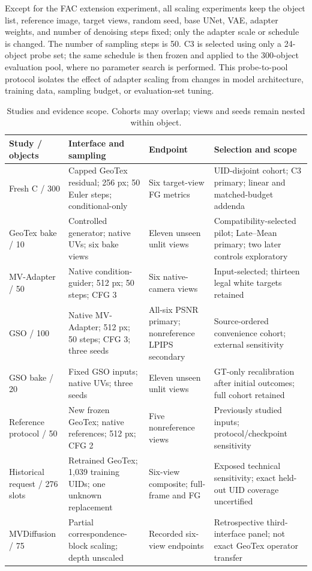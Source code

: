\documentclass[times,twocolumn,final]{elsarticle}
\providecommand{\DIFdel}[1]{{\protect\color{red} \scriptsize #1}} %
\providecommand{\DIFaddbegin}{} %
\providecommand{\DIFaddend}{} %
\providecommand{\DIFdelbegin}{} %
\providecommand{\DIFdelend}{} %
\begin{document}
\DIFdelbegin \DIFdel{Except for the FAC extension experiment, all scaling experiments keep the object list, reference image, target views, random seed, base UNet, VAE, adapter weights, and number of denoising steps fixed; only the adapter scale or schedule is changed. The number of sampling steps is 50. C3 is selected using only a 24-object probe set; the same schedule is then frozen and applied to the 300-object evaluation pool, where no parameter search is performed. This probe-to-pool protocol isolates the effect of adapter scaling from changes in model architecture, training data, sampling budget, or evaluation-set tuning. }\DIFdelend \DIFaddbegin \begin{table}[t]
\centering\footnotesize\setlength{\tabcolsep}{3.5pt}\renewcommand{\arraystretch}{1.08}
\caption{Studies and evidence scope. Cohorts may overlap; views and seeds remain nested within object.}
\label{tab:study-design}
\begin{tabular}{p{}p{}p{}p{}}
\toprule Study / objects & Interface and sampling & Endpoint & Selection and scope \\
\midrule
Fresh C / 300 & Capped GeoTex residual; 256 px; 50 Euler steps; conditional-only & Six target-view FG metrics & UID-disjoint cohort; C3 primary; linear and matched-budget addenda \\
GeoTex bake / 10 & Controlled generator; native UVs; six bake views & Eleven unseen unlit views & Compatibility-selected pilot; Late--Mean primary; two later controls exploratory \\
MV-Adapter / 50 & Native condition-guider; 512 px; 50 steps; CFG 3 & Six native-camera views & Input-selected; thirteen legal white targets retained \\
GSO / 100 & Native MV-Adapter; 512 px; 50 steps; CFG 3; three seeds & All-six PSNR primary; nonreference LPIPS secondary & Source-ordered convenience cohort; external sensitivity \\
GSO bake / 20 & Fixed GSO inputs; native UVs; three seeds & Eleven unseen unlit views & GT-only recalibration after initial outcomes; full cohort retained \\
Reference protocol / 50 & New frozen GeoTex; native references; 512 px; CFG 2 & Five nonreference views & Previously studied inputs; protocol/checkpoint sensitivity \\
Historical request / 276 slots & Retrained GeoTex; 1,039 training UIDs; one unknown replacement & Six-view composite; full-frame and FG & Exposed technical sensitivity; exact held-out UID coverage uncertified \\
MVDiffusion / 75 & Partial correspondence-block scaling; depth unscaled & Recorded six-view endpoints & Retrospective third-interface panel; not exact GeoTex operator transfer \\
\bottomrule
\end{tabular}
\end{table}
\DIFaddend
\end{document}
